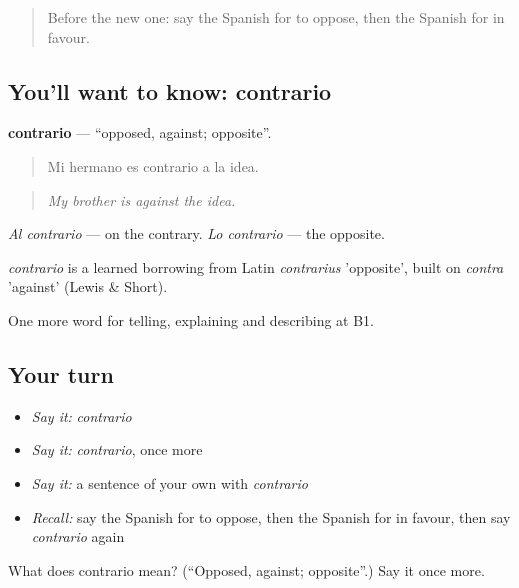 \label{lesson:ES-C578-contrario}



\begin{quote}
Before the new one: say the Spanish for to oppose, then the Spanish for in favour.
\end{quote}

\subsection*{You'll want to know: contrario}
\textbf{contrario} — \textquotedblleft{}opposed, against; opposite\textquotedblright{}.

\begin{quote}
Mi hermano es contrario a la idea.
\end{quote}

\begin{quote}
\emph{My brother is against the idea.}
\end{quote}

\emph{Al contrario} — on the contrary. \emph{Lo contrario} — the opposite.

\begin{cousinweb}
\emph{contrario} is a learned borrowing from Latin \emph{contrarius} 'opposite', built on \emph{contra} 'against' (Lewis \& Short).
\end{cousinweb}

\begin{grammarlens}[title={What you've built}]
One more word for telling, explaining and describing at B1.
\end{grammarlens}

\subsection*{Your turn}
\begin{itemize}
\raggedright
  \item \emph{Say it:} \emph{contrario}
  \item \emph{Say it:} \emph{contrario}, once more
  \item \emph{Say it:} a sentence of your own with \emph{contrario}
  \item \emph{Recall:} say the Spanish for to oppose, then the Spanish for in favour, then say \emph{contrario} again
\end{itemize}

\begin{tcolorbox}[breakable,colback=teal!4,colframe=teal!35!black,title={Before you move on}]
What does contrario mean? (\textquotedblleft{}Opposed, against; opposite\textquotedblright{}.) Say it once more.
\end{tcolorbox}

